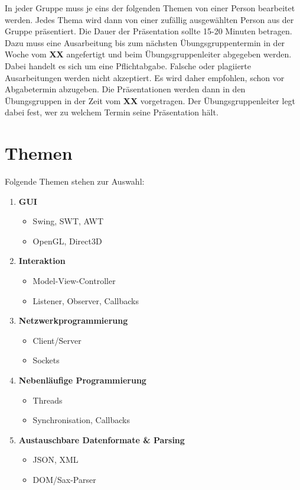 \documentclass{programmierpraktikum}
\subtitle{Seminarreferate}
\begin{document}
\maketitle
%
In jeder Gruppe muss je eins der folgenden Themen von einer Person be\-ar\-bei\-tet werden. Jedes Thema wird dann von einer zufällig ausgewählten Person aus der Gruppe präsentiert. Die Dauer der Präsentation sollte 15-20 Minuten betragen. Dazu muss eine Ausarbeitung bis zum nächsten Übungsgruppentermin in der Woche vom \textbf{XX} angefertigt und beim Übungsgruppenleiter ab\-ge\-ge\-ben werden. Dabei handelt es sich um eine Pflichtabgabe. Falsche oder plagiierte Ausarbeitungen werden nicht akzeptiert. Es wird daher empfohlen, schon vor Abgabetermin abzugeben. Die Präsentationen werden dann in den Übungsgruppen in der Zeit vom \textbf{XX} vorgetragen. Der Übungsgruppenleiter legt dabei fest, wer zu welchem Termin seine Präsentation hält.
%
\section{Themen}
Folgende Themen stehen zur Auswahl:
\begin{enumerate}
  \renewcommand{\labelenumi}{\textbf{\theenumi.}}
  \item \textbf{GUI}
    \begin{itemize}
      \item Swing, SWT, AWT
      \item OpenGL, Direct3D
    \end{itemize}
  \item \textbf{Interaktion}
    \begin{itemize}
      \item Model-View-Controller
      \item Listener, Observer, Callbacks
    \end{itemize}
  \item \textbf{Netzwerkprogrammierung}
    \begin{itemize}
      \item Client/Server
      \item Sockets
    \end{itemize}
  \item \textbf{Nebenläufige Programmierung}
    \begin{itemize}
      \item Threads
      \item Synchronisation, Callbacks
    \end{itemize}
  \item \textbf{Austauschbare Datenformate \& Parsing}
    \begin{itemize}
      \item JSON, XML
      \item DOM/Sax-Parser
    \end{itemize}
\end{enumerate}
\end{document}
